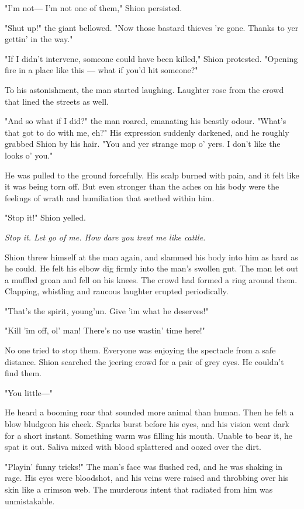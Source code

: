 "I'm not― I'm not one of them," Shion persisted.

"Shut up!" the giant bellowed. "Now those bastard thieves 're gone.
Thanks to yer gettin' in the way."

"If I didn't intervene, someone could have been killed," Shion
protested. "Opening fire in a place like this ― what if you'd hit
someone?"

To his astonishment, the man started laughing. Laughter rose from the
crowd that lined the streets as well.

"And so what if I did?" the man roared, emanating his beastly odour.
"What's that got to do with me, eh?" His expression suddenly darkened,
and he roughly grabbed Shion by his hair. "You and yer strange mop o'
yers. I don't like the looks o' you."

He was pulled to the ground forcefully. His scalp burned with pain, and
it felt like it was being torn off. But even stronger than the aches on
his body were the feelings of wrath and humiliation that seethed within
him.

"Stop it!" Shion yelled.

\emph{Stop it. Let go of me. How dare you treat me like cattle.}

Shion threw himself at the man again, and slammed his body into him as
hard as he could. He felt his elbow dig firmly into the man's swollen
gut. The man let out a muffled groan and fell on his knees. The crowd
had formed a ring around them. Clapping, whistling and raucous laughter
erupted periodically.

"That's the spirit, young'un. Give 'im what he deserves!"

"Kill 'im off, ol' man! There's no use wastin' time here!"

No one tried to stop them. Everyone was enjoying the spectacle from a
safe distance. Shion searched the jeering crowd for a pair of grey eyes.
He couldn't find them.

"You little―"

He heard a booming roar that sounded more animal than human. Then he
felt a blow bludgeon his cheek. Sparks burst before his eyes, and his
vision went dark for a short instant. Something warm was filling his
mouth. Unable to bear it, he spat it out. Saliva mixed with blood
splattered and oozed over the dirt.

"Playin' funny tricks!" The man's face was flushed red, and he was
shaking in rage. His eyes were bloodshot, and his veins were raised and
throbbing over his skin like a crimson web. The murderous intent that
radiated from him was unmistakable.

